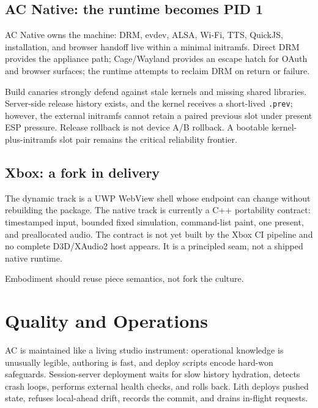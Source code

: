 \documentclass[10pt,letterpaper,twocolumn]{article}
\begin{document}
\subsection{AC Native: the runtime becomes PID 1}

AC Native owns the machine: DRM, evdev, ALSA, Wi-Fi, TTS, QuickJS, installation, and browser handoff live within a minimal initramfs. Direct DRM provides the appliance path; Cage/Wayland provides an escape hatch for OAuth and browser surfaces; the runtime attempts to reclaim DRM on return or failure.

Build canaries strongly defend against stale kernels and missing shared libraries. Server-side release history exists, and the kernel receives a short-lived \texttt{.prev}; however, the external initramfs cannot retain a paired previous slot under present ESP pressure. Release rollback is not device A/B rollback. A bootable kernel-plus-initramfs slot pair remains the critical reliability frontier.

\subsection{Xbox: a fork in delivery}

The dynamic track is a UWP WebView shell whose endpoint can change without rebuilding the package. The native track is currently a C++ portability contract: timestamped input, bounded fixed simulation, command-list paint, one present, and preallocated audio. The contract is not yet built by the Xbox CI pipeline and no complete D3D/XAudio2 host appears. It is a principled seam, not a shipped native runtime.

\begin{stackpull}
Embodiment should reuse piece semantics, not fork the culture.
\end{stackpull}

\section{Quality and Operations}

AC is maintained like a living studio instrument: operational knowledge is unusually legible, authoring is fast, and deploy scripts encode hard-won safeguards. Session-server deployment waits for slow history hydration, detects crash loops, performs external health checks, and rolls back. Lith deploys pushed state, refuses local-ahead drift, records the commit, and drains in-flight requests.
\end{document}
